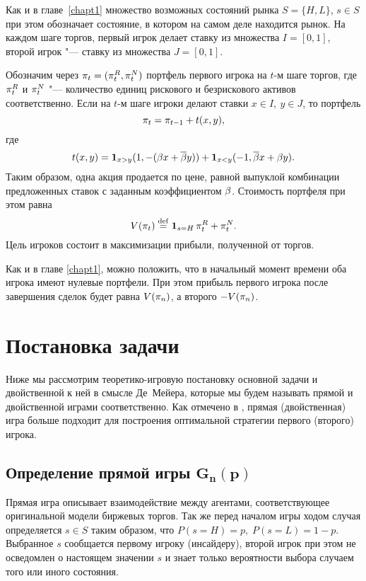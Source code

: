 {Как и в главе~\ref{chapt1} множество возможных состояний рынка $S = \{H, L\}$, $s \in S$ при этом обозначает состояние, в котором на самом деле находится рынок.
На каждом шаге торгов, первый игрок делает ставку из множества $I = [0, 1]$, второй игрок "--- ставку из множества $J = [0,1]$.

Обозначим через $\pi_{t} = (\pi_{t}^R, \pi_{t}^N)$ портфель первого игрока на $t$-м шаге торгов, где $\pi_{t}^R$ и $\pi_{t}^N$ "--- количество единиц рискового и безрискового активов соответственно.
Если на $t$-м шаге игроки делают ставки $x \in I,\ y \in J$, то портфель 
\[
\pi_{t} = \pi_{t-1} + t(x, y),
\]
где
\begin{equation}\label{ch3:eq:trans-mech}
  t(x, y) = \mathbf{1}_{x > y} (1, -(\beta x + {{\overline{\beta}}} y)) +
  \mathbf{1}_{x < y} (-1, {{\overline{\beta}}} x + \beta y).
\end{equation}
Таким образом, одна акция продается по цене, равной выпуклой комбинации предложенных ставок с заданным коэффициентом $\beta$.
Стоимость портфеля при этом равна
\begin{equation*}
  V(\pi_{t}) \overset{\mathrm{def}}{=} \mathbf{1}_{s = H} \, \pi_{t}^R + \pi_{t}^N.
\end{equation*}
Цель игроков состоит в максимизации прибыли, полученной от торгов.

Как и в главе \ref{chapt1}, можно положить, что в начальный момент времени оба игрока имеют нулевые портфели.
При этом прибыль первого игрока после завершения сделок будет равна $V(\pi_{n})$, а второго $-V(\pi_{n})$.

\section{Постановка задачи}
\label{ch3:sec:formal-descr}

Ниже мы рассмотрим теоретико-игровую постановку основной задачи и двойственной к ней в смысле Де~Мейера, которые мы будем называть прямой и двойственной играми соответственно.
Как отмечено в \cite{demeyer02}, прямая (двойственная) игра больше подходит для построения оптимальной стратегии первого (второго) игрока.

\subsection{Определение прямой игры $\mathbf{ G_{n}(p) }$}
Прямая игра описывает взаимодействие между агентами, соответствующее оригинальной модели биржевых торгов.
Так же перед началом игры ходом случая определяется $s \in S$ таким образом, что $P(s = H) = p, \; P(s = L) = 1-p$.
Выбранное $s$ сообщается первому игроку (инсайдеру), второй игрок при этом не осведомлен о настоящем значении $s$ и знает только вероятности выбора случаем того или иного состояния.

}
